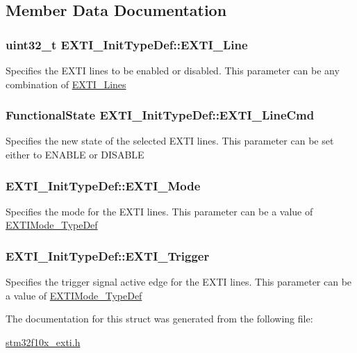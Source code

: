 \subsection{Member Data Documentation}
\hypertarget{structEXTI__InitTypeDef_a1b5bb38e1df331f764b830a1e8ec171f}{
\subsubsection[{EXTI\_\-Line}]{\setlength{\rightskip}{0pt plus 5cm}uint32\_\-t {\bf EXTI\_\-InitTypeDef::EXTI\_\-Line}}}
\label{structEXTI__InitTypeDef_a1b5bb38e1df331f764b830a1e8ec171f}
Specifies the EXTI lines to be enabled or disabled. This parameter can be any combination of \hyperlink{group__EXTI__Lines}{EXTI\_\-Lines} \hypertarget{structEXTI__InitTypeDef_ac1769bc5badaef4cffbcf105e3fe1c27}{
\subsubsection[{EXTI\_\-LineCmd}]{\setlength{\rightskip}{0pt plus 5cm}FunctionalState {\bf EXTI\_\-InitTypeDef::EXTI\_\-LineCmd}}}
\label{structEXTI__InitTypeDef_ac1769bc5badaef4cffbcf105e3fe1c27}
Specifies the new state of the selected EXTI lines. This parameter can be set either to ENABLE or DISABLE \hypertarget{structEXTI__InitTypeDef_a741816862b9cd43cc80781dc89150e7e}{
\subsubsection[{EXTI\_\-Mode}]{ {\bf EXTI\_\-InitTypeDef::EXTI\_\-Mode}}}
\label{structEXTI__InitTypeDef_a741816862b9cd43cc80781dc89150e7e}
Specifies the mode for the EXTI lines. This parameter can be a value of \hyperlink{group__EXTI__Exported__Types_gad5e69af98dc0dfdf64417adc1cf57929}{EXTIMode\_\-TypeDef} \hypertarget{structEXTI__InitTypeDef_ab0bd8417e78fe2b43eed79e44064510c}{
\subsubsection[{EXTI\_\-Trigger}]{ {\bf EXTI\_\-InitTypeDef::EXTI\_\-Trigger}}}
\label{structEXTI__InitTypeDef_ab0bd8417e78fe2b43eed79e44064510c}
Specifies the trigger signal active edge for the EXTI lines. This parameter can be a value of \hyperlink{group__EXTI__Exported__Types_gad5e69af98dc0dfdf64417adc1cf57929}{EXTIMode\_\-TypeDef} 

The documentation for this struct was generated from the following file:\begin{DoxyCompactItemize}
\item 
\hyperlink{stm32f10x__exti_8h}{stm32f10x\_\-exti.h}\end{DoxyCompactItemize}
